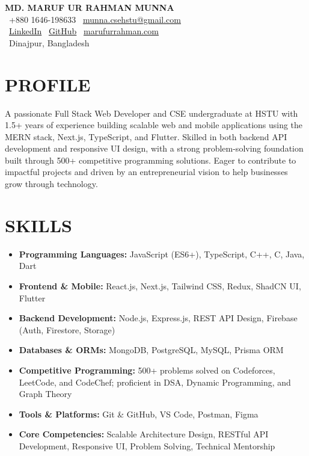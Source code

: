 \documentclass[10.5pt,a4paper]{article}
\begin{document}
\begin{center}
    {\LARGE \textbf{MD. MARUF UR RAHMAN MUNNA}} \\[5pt]
    \faPhone\ +880 1646-198633 \quad
    \faEnvelope\ \href{mailto:munna.csehstu@gmail.com}{munna.csehstu@gmail.com} \\
    \faLinkedin\ \href{https://www.linkedin.com/in/md-maruf-ur-rahman-munna}{LinkedIn} \quad
    \faGithub\ \href{https://github.com/maruf-git}{GitHub} \quad
    \faGlobe\ \href{https://marufurrahman.vercel.app/}{marufurrahman.com} \\
    \faMapMarker\ Dinajpur, Bangladesh
\end{center}

\vspace{-6pt}

\section*{PROFILE}
\vspace{4pt}
A passionate Full Stack Web Developer and CSE undergraduate at HSTU with 1.5+ years of experience building scalable web and mobile applications using the MERN stack, Next.js, TypeScript, and Flutter. Skilled in both backend API development and responsive UI design, with a strong problem-solving foundation built through 500+ competitive programming solutions. Eager to contribute to impactful projects and driven by an entrepreneurial vision to help businesses grow through technology.

\vspace{1pt}

\section*{SKILLS}
\vspace{4pt}
\begin{itemize}
    \item \textbf{Programming Languages:} JavaScript (ES6+), TypeScript, C++, C, Java, Dart
    \item \textbf{Frontend \& Mobile:} React.js, Next.js, Tailwind CSS, Redux, ShadCN UI, Flutter
    \item \textbf{Backend Development:} Node.js, Express.js, REST API Design, Firebase (Auth, Firestore, Storage)
    \item \textbf{Databases \& ORMs:} MongoDB, PostgreSQL, MySQL, Prisma ORM
    \item \textbf{Competitive Programming:} 500+ problems solved on Codeforces, LeetCode, and CodeChef; proficient in DSA, Dynamic Programming, and Graph Theory
    \item \textbf{Tools \& Platforms:} Git \& GitHub, VS Code, Postman, Figma
    \item \textbf{Core Competencies:} Scalable Architecture Design, RESTful API Development, Responsive UI, Problem Solving, Technical Mentorship
\end{itemize}
\end{document}
